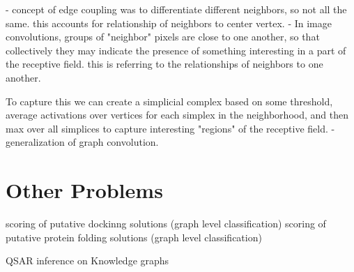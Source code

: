 - concept of edge coupling was to differentiate different neighbors, so not all the same. 
	this accounts for relationship of neighbors to center vertex. 
- In image convolutions, groups of "neighbor" pixels are close to one another, so that collectively they may indicate the presence of something interesting in a part of the receptive field. 
	this is referring to the relationships of neighbors to one another. 

	To capture this we can create a simplicial complex based on some threshold, average activations over vertices for each simplex in the neighborhood, and then max over all simplices to capture interesting "regions" of the receptive field. 
		- generalization of graph convolution.


\section{Other Problems}

scoring of putative dockinng solutions (graph level classification)
scoring of putative protein folding solutions (graph level classification)

QSAR
inference on Knowledge graphs


